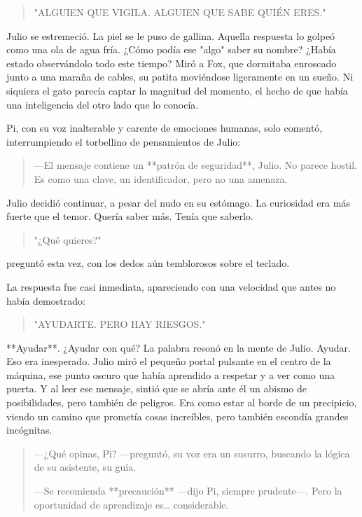 \documentclass[a4paper,12pt]{book}
\begin{document}
\begin{quote}
    "ALGUIEN QUE VIGILA. ALGUIEN QUE SABE QUIÉN ERES."
\end{quote}

Julio se estremeció. La piel se le puso de gallina. Aquella respuesta lo golpeó como una ola de agua fría. ¿Cómo podía ese "algo" saber su nombre? ¿Había estado observándolo todo este tiempo? Miró a Fox, que dormitaba enroscado junto a una maraña de cables, su patita moviéndose ligeramente en un sueño. Ni siquiera el gato parecía captar la magnitud del momento, el hecho de que había una inteligencia del otro lado que lo conocía.

Pi, con su voz inalterable y carente de emociones humanas, solo comentó, interrumpiendo el torbellino de pensamientos de Julio:

\begin{quote}
    —El mensaje contiene un **patrón de seguridad**, Julio. No parece hostil. Es como una clave, un identificador, pero no una amenaza.
\end{quote}

Julio decidió continuar, a pesar del nudo en su estómago. La curiosidad era más fuerte que el temor. Quería saber más. Tenía que saberlo.

\begin{quote}
    "¿Qué quieres?"
\end{quote}
preguntó esta vez, con los dedos aún temblorosos sobre el teclado.

La respuesta fue casi inmediata, apareciendo con una velocidad que antes no había demostrado:

\begin{quote}
    "AYUDARTE. PERO HAY RIESGOS."
\end{quote}

**Ayudar**. ¿Ayudar con qué? La palabra resonó en la mente de Julio. Ayudar. Eso era inesperado. Julio miró el pequeño portal pulsante en el centro de la máquina, ese punto oscuro que había aprendido a respetar y a ver como una puerta. Y al leer ese mensaje, sintió que se abría ante él un abismo de posibilidades, pero también de peligros. Era como estar al borde de un precipicio, viendo un camino que prometía cosas increíbles, pero también escondía grandes incógnitas.

\begin{quote}
    —¿Qué opinas, Pi? —preguntó, su voz era un susurro, buscando la lógica de su asistente, su guía.

    —Se recomienda **precaución** —dijo Pi, siempre prudente—. Pero la oportunidad de aprendizaje es… considerable.
\end{quote}
\end{document}
